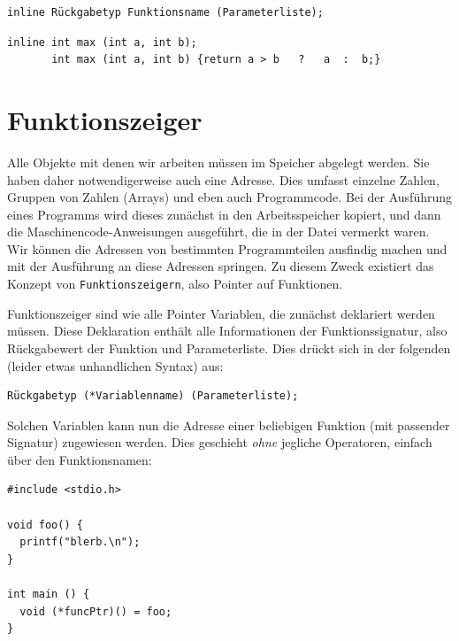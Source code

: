 \begin{codebox}
\begin{verbatim}
inline Rückgabetyp Funktionsname (Parameterliste);
\end{verbatim}
\end{codebox}

\begin{codebox}
\begin{verbatim}
inline int max (int a, int b);
       int max (int a, int b) {return a > b   ?   a  :  b;}
\end{verbatim}
\end{codebox}

\section{Funktionszeiger} \label{sec:funcPtr}
Alle Objekte mit denen wir arbeiten müssen im Speicher abgelegt werden. Sie haben daher notwendigerweise auch eine Adresse. Dies umfasst einzelne Zahlen, Gruppen von Zahlen (Arrays) und eben auch Programmcode. Bei der Ausführung eines Programms wird dieses zunächst in den Arbeitsspeicher kopiert, und dann die Maschinencode-Anweisungen ausgeführt, die in der Datei vermerkt waren. Wir können die Adressen von bestimmten Programmteilen ausfindig machen und mit der Ausführung an diese Adressen springen. Zu diesem Zweck existiert das Konzept von \texttt{Funktionszeigern}, also Pointer auf Funktionen.

Funktionszeiger sind wie alle Pointer Variablen, die zunächst deklariert werden müssen. Diese Deklaration enthält alle Informationen der Funktionssignatur, also Rückgabewert der Funktion und Parameterliste. Dies drückt sich in der folgenden (leider etwas unhandlichen Syntax) aus:
\begin{codebox}
\begin{verbatim}
Rückgabetyp (*Variablenname) (Parameterliste);
\end{verbatim}
\end{codebox}

Solchen Variablen kann nun die Adresse einer beliebigen Funktion (mit passender Signatur) zugewiesen werden. Dies geschieht \emph{ohne} jegliche Operatoren, einfach über den Funktionsnamen:

\begin{codebox}
\begin{verbatim}
#include <stdio.h>

void foo() {
  printf("blerb.\n");
}

int main () {
  void (*funcPtr)() = foo;
}
\end{verbatim}
\end{codebox}

